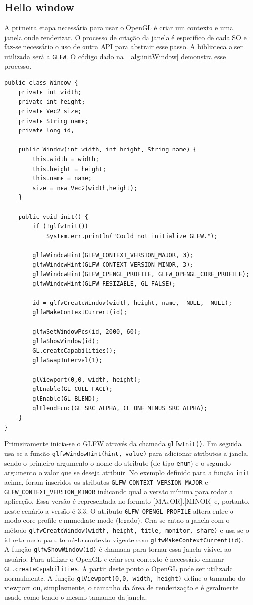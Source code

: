 \documentclass[12pt, 
openright, 
oneside, 
a4paper,    
brazil]{facom-ufu-abntex2}
\begin{document}
\subsection{Hello window}
A primeira etapa necessária para usar o OpenGL é criar um contexto e uma janela onde renderizar. O processo de criação da janela é específico de cada SO e faz-se necessário o uso de outra API para abstrair esse passo. A biblioteca a ser utilizada será a \texttt{GLFW}. O código dado na \lstlistingname~\ref{alg:initWindow} demonstra esse processo.
\begin{lstlisting}[caption=Inicialização da janela e contexto OpenGL, label={alg:initWindow}]
public class Window {
	private int width;
	private int height;
	private Vec2 size;
	private String name;
	private long id;
	
	public Window(int width, int height, String name) {
		this.width = width;
		this.height = height;
		this.name = name;
		size = new Vec2(width,height);
	}
	
	public void init() {
		if (!glfwInit()) 
			System.err.println("Could not initialize GLFW.");

		glfwWindowHint(GLFW_CONTEXT_VERSION_MAJOR, 3);
		glfwWindowHint(GLFW_CONTEXT_VERSION_MINOR, 3);
		glfwWindowHint(GLFW_OPENGL_PROFILE, GLFW_OPENGL_CORE_PROFILE);
		glfwWindowHint(GLFW_RESIZABLE, GL_FALSE);

		id = glfwCreateWindow(width, height, name,  NULL,  NULL);
		glfwMakeContextCurrent(id);

		glfwSetWindowPos(id, 2000, 60);
		glfwShowWindow(id);
		GL.createCapabilities();
		glfwSwapInterval(1);

		glViewport(0,0, width, height);
		glEnable(GL_CULL_FACE);
		glEnable(GL_BLEND);
		glBlendFunc(GL_SRC_ALPHA, GL_ONE_MINUS_SRC_ALPHA);
	}
}
\end{lstlisting}
Primeiramente inicia-se o GLFW através da chamada \texttt{glfwInit()}. Em seguida usa-se a função \texttt{glfwWindowHint(hint, value)} para adicionar atributos a janela, sendo o primeiro argumento o nome do atributo (de tipo \texttt{enum}) e o segundo argumento o valor que se deseja atribuir. No exemplo definido para a função \texttt{init} acima, foram inseridos os atributos \texttt{GLFW_CONTEXT_VERSION_MAJOR} e  \texttt{GLFW_CONTEXT_VERSION_MINOR} indicando qual a versão mínima para rodar a aplicação. Essa versão é representada no formato [MAJOR].[MINOR] e, portanto, neste cenário a versão é 3.3. O atributo \texttt{GLFW_OPENGL_PROFILE} altera entre o modo core profile e immediate mode (legado). Cria-se então a janela com o método \texttt{glfwCreateWindow(width, height, title, monitor, share)} e usa-se o id retornado para torná-lo contexto vigente com
\linebreak \texttt{glfwMakeContextCurrent(id)}. A função \texttt{glfwShowWindow(id)} é chamada para tornar essa janela visível ao usuário. Para utilizar o OpenGL e criar seu contexto é necessário chamar \texttt{GL.createCapabilities}. A partir deste ponto o OpenGL pode ser utilizado normalmente. A função \texttt{glViewport(0,0, width, height)} define o tamanho do viewport ou, simplesmente, o tamanho da área de renderização e é geralmente usado como tendo o mesmo tamanho da janela.
\end{document}
